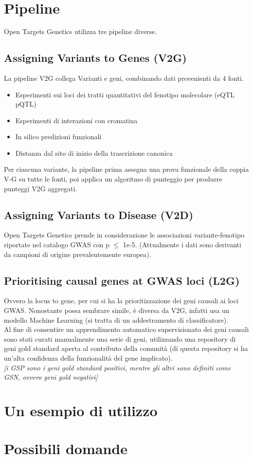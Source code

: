 \documentclass{article}
\begin{document}
\section{Pipeline}
Open Targets Genetics utilizza tre pipeline diverse.
\subsection{Assigning Variants to Genes (V2G)}
La pipeline V2G collega Varianti e geni, combinando dati provenienti da 4 fonti. 
\begin{itemize}
    \item Esperimenti sui loci dei tratti quantitativi del fenotipo molecolare (eQTL pQTL)
    \item Esperimenti di interazioni con cromatina
    \item In silico predizioni funzionali
    \item Distanza dal sito di inizio della trascrizione canonica
\end{itemize} 
Per ciascuna variante, la pipeline prima assegna una prova funzionale della coppia V-G su tutte le fonti, poi applica un algoritmo di punteggio per produrre punteggi V2G aggregati. 
\subsection{Assigning Variants to Disease (V2D)}
Open Targets Genetics prende in considerazione le associazioni variante-fenotipo riportate nel catalogo GWAS con p $\leq$ 1e-5. 
(Attualmente i dati sono derivanti da campioni di origine prevalentemente europea). 
\subsection{Prioritising causal genes at GWAS loci (L2G)}
Ovvero la locus to gene, per cui si ha la prioritizzazione dei geni causali ai loci GWAS. Nonostante possa sembrare simile, è diversa da V2G, infatti usa un modello Machine Learning (si tratta di un addestramento di classificatore).\\
Al fine di consentire un apprendimento automatico supervisionato dei geni causali sono stati curati manualmente una serie di geni, utilizzando una repository di geni gold standard aperta al contributo della comunità (di questa repository si ha un’alta confidenza della funzionalità del gene implicato).\\
\textit{[i GSP sono i geni gold standard positivi, mentre gli altri sono definiti come GSN, ovvero geni gold negativi]}
\section{Un esempio di utilizzo}


\section{Possibili domande}
\end{document}

